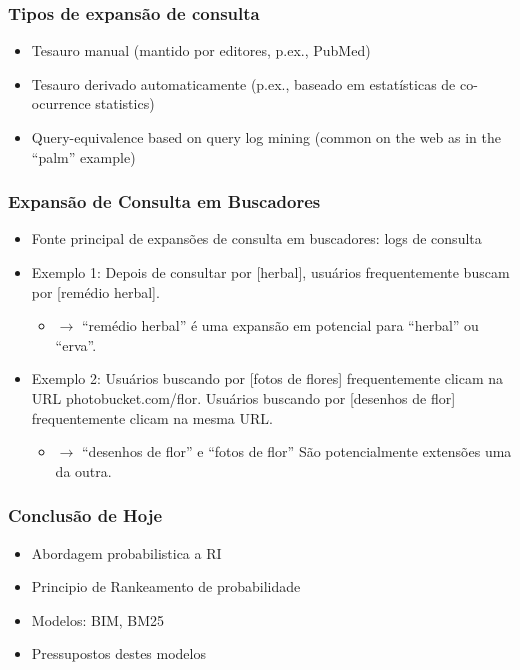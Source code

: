\documentclass[compress]{beamer}
\def\myblue#1{\textcolor{texblue}{#1}}
\begin{document}
\begin{frame}
\frametitle{Tipos de expansão de consulta}
\begin{itemize}
\item Tesauro manual (mantido por editores, p.ex., PubMed)
\item Tesauro derivado automaticamente (p.ex., baseado em estatísticas de co-ocurrence statistics)
\item Query-equivalence based on query log mining (common on
  the web as in the ``palm'' example)
\end{itemize}
\end{frame}

\begin{frame}
\frametitle{Expansão de Consulta em Buscadores}
\begin{itemize}
\item Fonte principal de expansões de consulta em buscadores: logs de consulta
\item Exemplo 1: Depois de consultar por [herbal], usuários frequentemente buscam por [remédio herbal].
\begin{itemize}
\item $\rightarrow$ 
``remédio herbal'' é uma expansão em potencial para ``herbal'' ou ``erva''.
\end{itemize}

\item Exemplo 2: Usuários buscando por [fotos de flores] frequentemente clicam na URL \myblue{photobucket.com/flor}. 
Usuários buscando por [desenhos de flor]
  frequentemente clicam na \myblue{mesma URL}.
\begin{itemize}
\item $\rightarrow$ 
``desenhos de flor'' e ``fotos de flor'' São potencialmente extensões uma da outra.
\end{itemize}

\end{itemize}
\end{frame}


\begin{frame}

\frametitle{Conclusão de Hoje}
\begin{itemize}
\item Abordagem probabilistica a RI
\item Principio de Rankeamento de probabilidade
\item Modelos: BIM, BM25
\item Pressupostos destes modelos
\end{itemize}
\end{frame}
\end{document}
